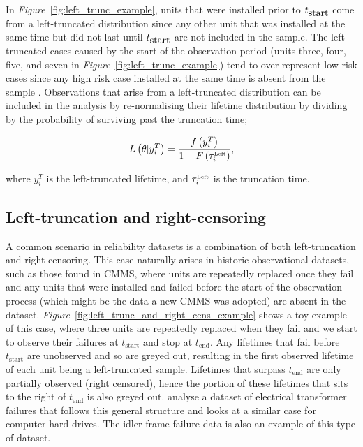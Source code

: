 In \textit{Figure}~\ref{fig:left_trunc_example}, units that were installed prior to $t_{\hbox{start}}$ come from a left-truncated distribution since any other unit that was installed at the same time but did not last until $t_{\hbox{start}}$ are not included in the sample. The left-truncated cases caused by the start of the observation period (units three, four, five, and seven in \textit{Figure}~\ref{fig:left_trunc_example}) tend to over-represent low-risk cases since any high risk case installed at the same time is absent from the sample \citep{guo1993}. Observations that arise from a left-truncated distribution can be included in the analysis by re-normalising their lifetime distribution by dividing by the probability of surviving past the truncation time;

\begin{equation}
    \label{eq:left_trunc}
    L\left(\theta|y^T_i\right) = \frac{f\left(y^T_i\right)}{1 - F\left(\tau^{\hbox{\tiny{Left}}}_i\right)},
\end{equation}

\noindent where $y^T_i$ is the left-truncated lifetime, and $\tau^{\hbox{\tiny{Left}}}_i$ is the truncation time.

\subsection{Left-truncation and right-censoring} 

A common scenario in reliability datasets is a combination of both left-truncation and right-censoring. This case naturally arises in historic observational datasets, such as those found in CMMS, where units are repeatedly replaced once they fail and any units that were installed and failed before the start of the observation process (which might be the data a new CMMS was adopted) are absent in the dataset. \textit{Figure}~\ref{fig:left_trunc_and_right_cens_example} shows a toy example of this case, where three units are repeatedly replaced when they fail and we start to observe their failures at $t_{\text{start}}$ and stop at $t_{\text{end}}$. Any lifetimes that fail before $t_{\text{start}}$ are unobserved and so are greyed out, resulting in the first observed lifetime of each unit being a left-truncated sample. Lifetimes that surpass $t_{\text{end}}$ are only partially observed (right censored), hence the portion of these lifetimes that sits to the right of $t_{\text{end}}$ is also greyed out. \citet{hong2009,mitra2013,kundu2016} analyse a dataset of electrical transformer failures that follows this general structure and \citet{mittman2013} looks at a similar case for computer hard drives. The idler frame failure data is also an example of this type of dataset.

